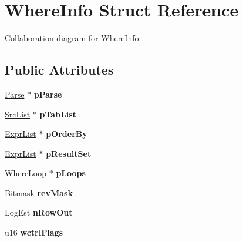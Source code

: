 \hypertarget{struct_where_info}{\section{Where\+Info Struct Reference}
\label{struct_where_info}
}


Collaboration diagram for Where\+Info\+:
\subsection*{Public Attributes}
\begin{DoxyCompactItemize}
\item 
\hypertarget{struct_where_info_a26745055cd13360536fb4b074db358f9}{\hyperlink{struct_parse}{Parse} $\ast$ {\bfseries p\+Parse}}\label{struct_where_info_a26745055cd13360536fb4b074db358f9}

\item 
\hypertarget{struct_where_info_a0f43432aeca75640c96a69f6a82aa138}{\hyperlink{struct_src_list}{Src\+List} $\ast$ {\bfseries p\+Tab\+List}}\label{struct_where_info_a0f43432aeca75640c96a69f6a82aa138}

\item 
\hypertarget{struct_where_info_a7d15fd39a32b8324e03b1c0b1db991a2}{\hyperlink{struct_expr_list}{Expr\+List} $\ast$ {\bfseries p\+Order\+By}}\label{struct_where_info_a7d15fd39a32b8324e03b1c0b1db991a2}

\item 
\hypertarget{struct_where_info_ad480304ebeadcad7cb742dd8d8e11a0b}{\hyperlink{struct_expr_list}{Expr\+List} $\ast$ {\bfseries p\+Result\+Set}}\label{struct_where_info_ad480304ebeadcad7cb742dd8d8e11a0b}

\item 
\hypertarget{struct_where_info_a98f12794aec775d30b51d9cbdec90801}{\hyperlink{struct_where_loop}{Where\+Loop} $\ast$ {\bfseries p\+Loops}}\label{struct_where_info_a98f12794aec775d30b51d9cbdec90801}

\item 
\hypertarget{struct_where_info_abff60764e39a62d7ede2a5d8f1ce4fff}{Bitmask {\bfseries rev\+Mask}}\label{struct_where_info_abff60764e39a62d7ede2a5d8f1ce4fff}

\item 
\hypertarget{struct_where_info_a694860f22a9fb8d9edae023fc134cf6f}{Log\+Est {\bfseries n\+Row\+Out}}\label{struct_where_info_a694860f22a9fb8d9edae023fc134cf6f}

\item 
\hypertarget{struct_where_info_a85ac59be7be01c6b08f8b225585d27e0}{u16 {\bfseries wctrl\+Flags}}\label{struct_where_info_a85ac59be7be01c6b08f8b225585d27e0}


\end{DoxyCompactItemize}
